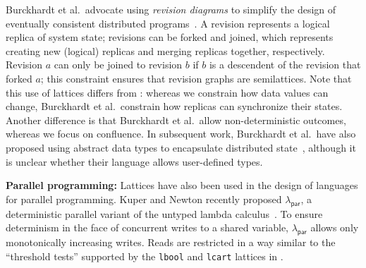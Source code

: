 Burckhardt et al.\ advocate using \emph{revision diagrams} to simplify the
design of eventually consistent distributed programs~\cite{Burckhardt2012a}. A
revision represents a logical replica of system state; revisions can be forked
and joined, which represents creating new (logical) replicas and merging
replicas together, respectively. Revision $a$ can only be joined to revision $b$
if $b$ is a descendent of the revision that forked $a$; this constraint ensures
that revision graphs are semilattices. Note that this use of lattices differs
from \lang: whereas we constrain how data values can change, Burckhardt et al.\
constrain how replicas can synchronize their states. Another difference is that
Burckhardt et al.\ allow non-deterministic outcomes, whereas we focus on
confluence. In subsequent work, Burckhardt et al.\ have also proposed using
abstract data types to encapsulate distributed state~\cite{Burckhardt2012b},
although it is unclear whether their language allows user-defined types.





\vspace{0.5em}\noindent
\textbf{Parallel programming:} Lattices have also been used in the design of
languages for parallel programming. Kuper and Newton recently proposed
$\lambda_{\textsf{par}}$, a deterministic parallel variant of the untyped lambda
calculus~\cite{Kuper2012}. To ensure determinism in the face of concurrent
writes to a shared variable, $\lambda_{\textsf{par}}$ allows only monotonically
increasing writes. Reads are restricted in a way similar to the ``threshold
tests'' supported by the \texttt{lbool} and \texttt{lcart} lattices in \lang.

